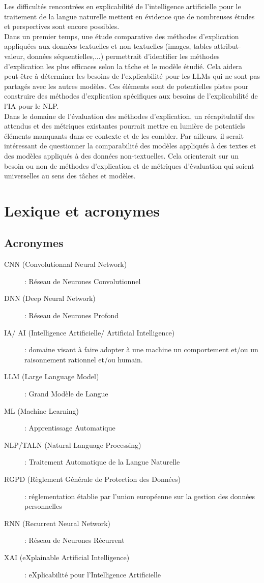 \documentclass{report}
\begin{document}
    Les difficultés rencontrées en explicabilité de l'intelligence artificielle pour le traitement de la langue naturelle mettent en évidence que de nombreuses études et perspectives sont encore possibles. \\
    Dans un premier temps, une étude comparative des méthodes d'explication appliquées aux données textuelles et non textuelles (images, tables attribut-valeur, données séquentielles,...) permettrait d'identifier les méthodes d'explication les plus efficaces selon la tâche et le modèle étudié. Cela aidera peut-être à déterminer les besoins de l'explicabilité pour les LLMs qui ne sont pas partagés avec les autres modèles. Ces éléments sont de potentielles pistes pour construire des méthodes d'explication spécifiques aux besoins de l'explicabilité de l'IA pour le NLP. \\
    Dans le domaine de l’évaluation des méthodes d’explication, un récapitulatif des attendus et des métriques existantes pourrait mettre en lumière de potentiels éléments manquants dans ce contexte et de les combler. Par ailleurs, il serait intéressant de questionner la comparabilité des modèles appliqués à des textes et des modèles appliqués à des données non-textuelles. Cela orienterait sur un besoin ou non de méthodes d'explication et de métriques d'évaluation qui soient universelles au sens des tâches et modèles.
    

\chapter{Lexique et acronymes}
\section{Acronymes}

\begin{description}
    \item[CNN (Convolutionnal Neural Network)] : Réseau de Neurones Convolutionnel
    \item[DNN (Deep Neural Network)] : Réseau de Neurones Profond
    \item[IA/ AI (Intelligence Artificielle/ Artificial Intelligence)] : domaine visant à faire adopter à une machine un comportement et/ou un raisonnement rationnel et/ou humain.
    \item[LLM (Large Language Model)] : Grand Modèle de Langue
    \item[ML (Machine Learning)] :  Apprentissage Automatique
    \item[NLP/TALN (Natural Language Processing)] : Traitement Automatique de la Langue Naturelle
    \item[RGPD (Règlement Générale de Protection des Données)] : réglementation établie par l'union européenne sur la gestion des données personnelles
    \item[RNN (Recurrent Neural Network)] : Réseau de Neurones Récurrent
    \item[XAI (eXplainable Artificial Intelligence)] : eXplicabilité pour l'Intelligence Artificielle
\end{description}
\end{document}
